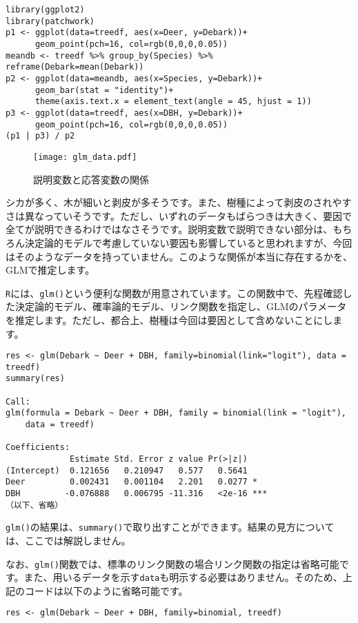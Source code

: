 \begin{verbatim}
library(ggplot2)
library(patchwork)
p1 <- ggplot(data=treedf, aes(x=Deer, y=Debark))+
      geom_point(pch=16, col=rgb(0,0,0,0.05))
meandb <- treedf %>% group_by(Species) %>% reframe(Debark=mean(Debark))
p2 <- ggplot(data=meandb, aes(x=Species, y=Debark))+
      geom_bar(stat = "identity")+
      theme(axis.text.x = element_text(angle = 45, hjust = 1))  
p3 <- ggplot(data=treedf, aes(x=DBH, y=Debark))+
      geom_point(pch=16, col=rgb(0,0,0,0.05))
(p1 | p3) / p2
\end{verbatim}
\begin{figure}[htb]
\begin{center}
\graphicspath{{3_glm/figs/}}
\texttt{[image: glm\_data.pdf]}\\
\caption{説明変数と応答変数の関係}
\label{glm_data}
\end{center}
\end{figure}

シカが多く、木が細いと剥皮が多そうです。また、樹種によって剥皮のされやすさは異なっていそうです。ただし、いずれのデータもばらつきは大きく、要因で全てが説明できるわけではなさそうです。説明変数で説明できない部分は、もちろん決定論的モデルで考慮していない要因も影響していると思われますが、今回はそのようなデータを持っていません。このような関係が本当に存在するかを、GLMで推定します。

\verb|R|には、\verb|glm()|という便利な関数が用意されています。この関数中で、先程確認した決定論的モデル、確率論的モデル、リンク関数を指定し、GLMのパラメータを推定します。ただし、都合上、樹種は今回は要因として含めないことにします。
\begin{verbatim}
res <- glm(Debark ~ Deer + DBH, family=binomial(link="logit"), data = treedf)
summary(res)

Call:
glm(formula = Debark ~ Deer + DBH, family = binomial(link = "logit"), 
    data = treedf)

Coefficients:
             Estimate Std. Error z value Pr(>|z|)    
(Intercept)  0.121656   0.210947   0.577   0.5641    
Deer         0.002431   0.001104   2.201   0.0277 *  
DBH         -0.076888   0.006795 -11.316   <2e-16 ***
（以下、省略）
\end{verbatim}
\verb|glm()|の結果は、\verb|summary()|で取り出すことができます。結果の見方については、ここでは解説しません。

なお、\verb|glm()|関数では、標準のリンク関数の場合リンク関数の指定は省略可能です。また、用いるデータを示す\verb|data|も明示する必要はありません。そのため、上記のコードは以下のように省略可能です。
\begin{verbatim}
res <- glm(Debark ~ Deer + DBH, family=binomial, treedf)
\end{verbatim}

